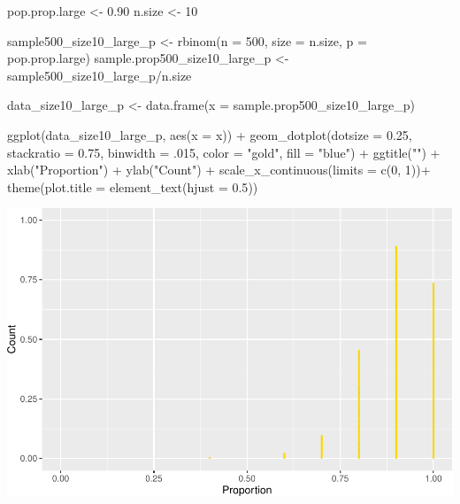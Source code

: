 \documentclass[
]{book}
\newenvironment{Shaded}{\begin{snugshade}}{\end{snugshade}}
\newcommand{\AttributeTok}[1]{\textcolor[rgb]{0.77,0.63,0.00}{#1}}
\newcommand{\DecValTok}[1]{\textcolor[rgb]{0.00,0.00,0.81}{#1}}
\newcommand{\FloatTok}[1]{\textcolor[rgb]{0.00,0.00,0.81}{#1}}
\newcommand{\FunctionTok}[1]{\textcolor[rgb]{0.00,0.00,0.00}{#1}}
\newcommand{\NormalTok}[1]{#1}
\newcommand{\OtherTok}[1]{\textcolor[rgb]{0.56,0.35,0.01}{#1}}
\newcommand{\SpecialCharTok}[1]{\textcolor[rgb]{0.00,0.00,0.00}{#1}}
\newcommand{\StringTok}[1]{\textcolor[rgb]{0.31,0.60,0.02}{#1}}
\begin{document}
\begin{Shaded}
\begin{Highlighting}[]
\NormalTok{pop.prop.large }\OtherTok{\textless{}{-}} \FloatTok{0.90}
\NormalTok{n.size }\OtherTok{\textless{}{-}} \DecValTok{10}

\NormalTok{sample500\_size10\_large\_p }\OtherTok{\textless{}{-}} \FunctionTok{rbinom}\NormalTok{(}\AttributeTok{n =} \DecValTok{500}\NormalTok{, }\AttributeTok{size =}\NormalTok{ n.size, }\AttributeTok{p =}\NormalTok{ pop.prop.large)  }
\NormalTok{sample.prop500\_size10\_large\_p }\OtherTok{\textless{}{-}}\NormalTok{ sample500\_size10\_large\_p}\SpecialCharTok{/}\NormalTok{n.size }

\NormalTok{data\_size10\_large\_p }\OtherTok{\textless{}{-}} \FunctionTok{data.frame}\NormalTok{(}\AttributeTok{x =}\NormalTok{ sample.prop500\_size10\_large\_p)}

\FunctionTok{ggplot}\NormalTok{(data\_size10\_large\_p, }\FunctionTok{aes}\NormalTok{(}\AttributeTok{x =}\NormalTok{ x)) }\SpecialCharTok{+}
 \FunctionTok{geom\_dotplot}\NormalTok{(}\AttributeTok{dotsize =} \FloatTok{0.25}\NormalTok{,}
               \AttributeTok{stackratio =} \FloatTok{0.75}\NormalTok{,}
               \AttributeTok{binwidth =}\NormalTok{ .}\DecValTok{015}\NormalTok{,}
               \AttributeTok{color =} \StringTok{"gold"}\NormalTok{,}
               \AttributeTok{fill =} \StringTok{"blue"}\NormalTok{) }\SpecialCharTok{+} 
  \FunctionTok{ggtitle}\NormalTok{(}\StringTok{""}\NormalTok{) }\SpecialCharTok{+}  \FunctionTok{xlab}\NormalTok{(}\StringTok{"Proportion"}\NormalTok{) }\SpecialCharTok{+} \FunctionTok{ylab}\NormalTok{(}\StringTok{"Count"}\NormalTok{) }\SpecialCharTok{+}
  \FunctionTok{scale\_x\_continuous}\NormalTok{(}\AttributeTok{limits =} \FunctionTok{c}\NormalTok{(}\DecValTok{0}\NormalTok{, }\DecValTok{1}\NormalTok{))}\SpecialCharTok{+} 
  \FunctionTok{theme}\NormalTok{(}\AttributeTok{plot.title =} \FunctionTok{element\_text}\NormalTok{(}\AttributeTok{hjust =} \FloatTok{0.5}\NormalTok{))}
\end{Highlighting}
\end{Shaded}

\includegraphics[width=1\linewidth]{Class_Activity_7_files/figure-latex/unnamed-chunk-17-1}
\end{document}
